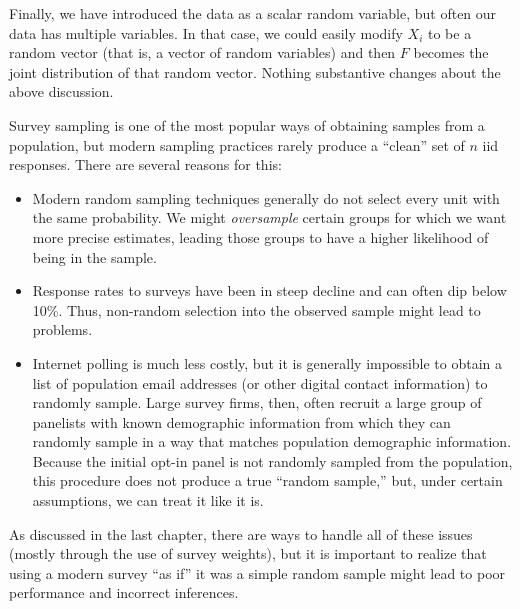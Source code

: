\documentclass[
  letterpaper,
  DIV=11,
  numbers=noendperiod]{scrreprt}
\theoremstyle{definition}
\theoremstyle{definition}
\theoremstyle{plain}
\theoremstyle{remark}
\begin{document}
Finally, we have introduced the data as a scalar random variable, but
often our data has multiple variables. In that case, we could easily
modify \(X_i\) to be a random vector (that is, a vector of random
variables) and then \(F\) becomes the joint distribution of that random
vector. Nothing substantive changes about the above discussion.

\begin{tcolorbox}[enhanced jigsaw, colbacktitle=quarto-callout-warning-color!10!white, breakable, toptitle=1mm, opacityback=0, leftrule=.75mm, rightrule=.15mm, coltitle=black, opacitybacktitle=0.6, toprule=.15mm, arc=.35mm, bottomtitle=1mm, titlerule=0mm, title=\textcolor{quarto-callout-warning-color}{\faExclamationTriangle}\hspace{0.5em}{Warning}, colframe=quarto-callout-warning-color-frame, bottomrule=.15mm, colback=white, left=2mm]

Survey sampling is one of the most popular ways of obtaining samples
from a population, but modern sampling practices rarely produce a
``clean'' set of \(n\) iid responses. There are several reasons for
this:

\begin{itemize}
\item
  Modern random sampling techniques generally do not select every unit
  with the same probability. We might \emph{oversample} certain groups
  for which we want more precise estimates, leading those groups to have
  a higher likelihood of being in the sample.
\item
  Response rates to surveys have been in steep decline and can often dip
  below 10\%. Thus, non-random selection into the observed sample might
  lead to problems.
\item
  Internet polling is much less costly, but it is generally impossible
  to obtain a list of population email addresses (or other digital
  contact information) to randomly sample. Large survey firms, then,
  often recruit a large group of panelists with known demographic
  information from which they can randomly sample in a way that matches
  population demographic information. Because the initial opt-in panel
  is not randomly sampled from the population, this procedure does not
  produce a true ``random sample,'' but, under certain assumptions, we
  can treat it like it is.
\end{itemize}

As discussed in the last chapter, there are ways to handle all of these
issues (mostly through the use of survey weights), but it is important
to realize that using a modern survey ``as if'' it was a simple random
sample might lead to poor performance and incorrect inferences.

\end{tcolorbox}
\end{document}
